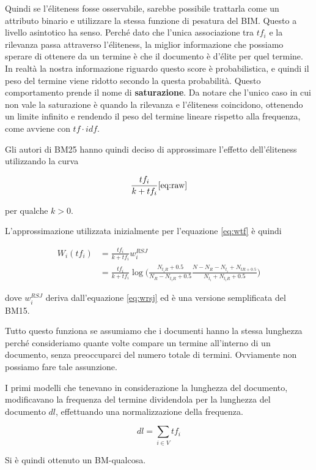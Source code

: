 Quindi se l'éliteness fosse osservabile, sarebbe possibile trattarla come un attributo binario e utilizzare la stessa funzione di pesatura del BIM.
Questo a livello asintotico ha senso. Perché dato che l'unica associazione tra $tf_i$ e la rilevanza passa attraverso l'éliteness, la miglior informazione che possiamo sperare di ottenere da un termine è che il documento è d'élite per quel termine. In realtà la nostra informazione riguardo questo score è probabilistica, e quindi il peso del termine viene ridotto secondo la questa probabilità. Questo comportamento prende il nome di \textbf{saturazione}.
Da notare che l'unico caso in cui non vale la saturazione è quando la rilevanza e l'éliteness coincidono, ottenendo un limite infinito e rendendo il peso del termine lineare rispetto alla frequenza, come avviene con $tf\cdot idf$.

Gli autori di BM25 hanno quindi deciso di approssimare l'effetto dell'éliteness utilizzando la curva

\begin{align}
\frac{tf_i}{k + tf_i} \ref{eq:raw}
\end{align}

\noindent per qualche $k > 0$.

L'approssimazione utilizzata inizialmente per l'equazione \ref{eq:wtf} è quindi

\begin{align*}
W_i(tf_i) &= \frac{tf_i}{k + tf_i}  w_i^{RSJ} \\
&=\frac{tf_i}{k + tf_i}  \log \bigg( \frac{N_{t_iR} + 0.5}{N_R - N_{t_iR} + 0.5} \frac{N - N_R - N_{t_i} + N_{tR + 0.5}}{N_{t_i} + N_{t_iR} +0.5} \bigg)
\end{align*}

\noindent dove $w_i^{RSJ}$ deriva dall'equazione \ref{eq:wrsj} ed è una versione semplificata del BM15.

Tutto questo funziona se assumiamo che i documenti hanno la stessa lunghezza perché consideriamo quante volte compare un termine all'interno di un documento, senza preoccuparci del numero totale di termini. Ovviamente non possiamo fare tale assunzione.

I primi modelli che tenevano in considerazione la lunghezza del documento, modificavano la frequenza del termine dividendola per la lunghezza del documento $dl$, effettuando una normalizzazione della frequenza.

$$
dl = \sum\limits_{i \in V} tf_i
$$

\noindent Si è quindi ottenuto un BM-qualcosa.

